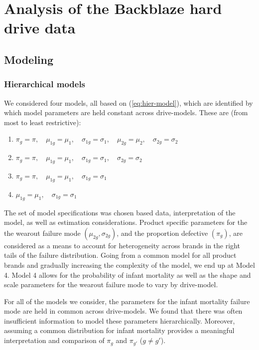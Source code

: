 \documentclass[aap]{imsart}
\begin{document}
\section{Analysis of the Backblaze hard drive data}
\label{sec:Data analysis}
\subsection{Modeling}
\subsubsection{Hierarchical models}
We considered four models, all based on (\ref{eq:hier-model}), which are identified by which model parameters are held constant across drive-models. These are (from most to least restrictive):

\begin{enumerate}
\item $\pi_{g} = \pi,\quad \mu_{1g} = \mu_1,\quad \sigma_{1g}=\sigma_1,\quad \mu_{2g} = \mu_2,\quad \sigma_{2g} = \sigma_2$
\item $\pi_{g} = \pi,\quad \mu_{1g} = \mu_1,\quad \sigma_{1g}=\sigma_1,\quad \sigma_{2g} = \sigma_2$
\item $\pi_{g} = \pi,\quad \mu_{1g} = \mu_1,\quad \sigma_{1g}=\sigma_1$
\item $\mu_{1g} = \mu_1,\quad \sigma_{1g}=\sigma_1$
\end{enumerate}

The set of model specifications was chosen based data, interpretation of the model, as well as estimation considerations.  Product specific parameters for the the wearout failure mode $(\mu_{2g},\sigma_{2g})$, and the proportion defective $(\pi_g)$, are considered as a means to account for heterogeneity across brands in the right tails of the failure distribution.  Going from a common model for all product brands and gradually increasing the complexity of the model, we end up at Model 4.  Model 4 allows for the probability of infant mortality as well as the shape and scale parameters for the wearout failure mode to vary by drive-model.

For all of the models we consider, the parameters for the infant mortality failure mode are held in common across drive-models.  We found that there was often insufficient information to model these parameters hierarchically.  Moreover, assuming a common distribution for infant mortality provides a meaningful interpretation and comparison of $\pi_g$ and $\pi_{g'}$ ($g \neq g'$). 
\end{document}
